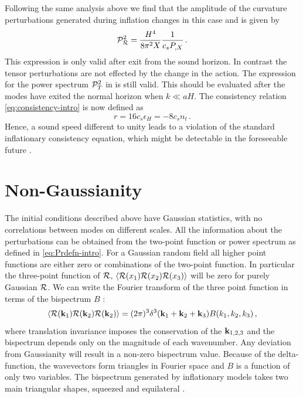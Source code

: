 Following the same analysis above we find that the amplitude of the curvature 
perturbations 
generated during inflation changes in this case and is given by \cite{gm}
% 
\begin{equation} 
\label{eq:Ps-dbiintro}
 \mathcal{P}_{\mathcal{R}}^2  = \frac{H^4}{8\pi^2 X}\frac{1}{c_s P_{,X}} \,.
\end{equation}
% 
This expression is only valid after exit from the sound horizon. In contrast
the tensor perturbations are not effected by the change in the action. The
expression for the power spectrum $\mathcal{P}_T^2$ in  is still valid.
This should be evaluated after the modes have exited the normal horizon
when $k\ll aH$. 
The consistency relation \eqref{eq:consistency-intro} is now defined as
\cite{gm} 
% 
\begin{equation}
\label{eq:rdefn-dbiintro}
  r = 16c_s \epsilon_H = -8c_s n_t \,.
\end{equation}
% 
Hence, a sound speed different to unity leads to a violation of the 
standard inflationary consistency equation, which might be 
detectable in the foreseeable future \cite{lidser1,lidser2}. 




\section{Non-Gaussianity}
\label{sec:fnl-intro}
The initial conditions described above have Gaussian statistics, with no correlations between modes
on different scales. All the information about the perturbations can be obtained from the
two-point function or power spectrum as defined in \eqref{eq:Prdefn-intro}. For a Gaussian random 
field all higher point functions are either zero or combinations of the two-point function. In
particular the three-point function of $\mathcal{R}$, $\langle
\mathcal{R}(x_1)\mathcal{R}(x_2)\mathcal{R}(x_3)\rangle$ will be zero for purely Gaussian $\mathcal{R}$. We can
write the Fourier
transform of the three point function in terms of the bispectrum $B$
\cite{Bartolo:2004if}:
% 
\begin{equation}
 \langle \mathcal{R}(\textbf{k}_1)\mathcal{R}(\textbf{k}_2)\mathcal{R}(\textbf{k}_2)\rangle = (2\pi)^3 \delta^3(\textbf{k}_1 + \textbf{k}_2 + \textbf{k}_3) B(k_1, k_2,
k_3)\,,
\end{equation}
% 
where translation invariance imposes the conservation of the $\textbf{k}_{1,2,3}$ and
the bispectrum
depends only on the magnitude of each wavenumber. Any deviation from Gaussianity
will result in a
non-zero bispectrum value. 
Because of the delta-function, the wavevectors form triangles in Fourier
space and $B$ is a function of only two variables. The bispectrum generated by
inflationary models
takes two main triangular shapes, squeezed and equilateral \cite{Babich:2004gb}.
 

